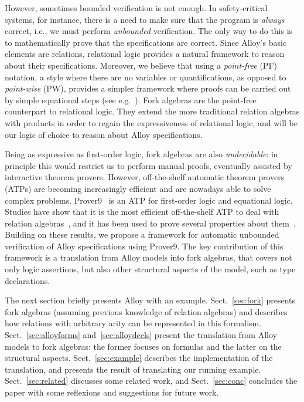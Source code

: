 \documentclass{llncs}
\begin{document}
However, sometimes bounded verification is not enough. In
safety-critical systems, for instance, there is a need to make sure
that the program is \emph{always} correct, i.e., we must perform
\emph{unbounded} verification. The only way to do this is to
mathematically prove that the specifications are correct. Since
Alloy's basic elements are relations, relational logic provides a
natural framework to reason about their specifications. Moreover, we
believe that using a \emph{point-free} (PF) notation, a style where
there are no variables or quantifications, as opposed to
\emph{point-wise} (PW), provides a simpler framework where proofs can
be carried out by simple equational steps (see
e.g.~\cite{escpf}). Fork algebras are the point-free counterpart to
relational logic. They extend the more traditional relation algebras
with products in order to regain the expressiveness of relational
logic, and will be our logic of choice to reason about Alloy
specifications.

Being as expressive as first-order logic, fork algebras are also
\emph{undecidable}: in principle this would restrict us to perform
manual proofs, eventually assisted by interactive theorem
provers. However, off-the-shelf automatic theorem provers (ATPs) are
becoming increasingly efficient and are nowadays able to solve complex
problems. Prover9~\cite{prover9} is an ATP for first-order logic and
equational logic. Studies have show that it is the most efficient
off-the-shelf ATP to deal with relation algebras~\cite{atmcomp}, and
it has been used to prove several properties about them~\cite{crp9}.
Building on these results, we propose a framework for automatic
unbounded verification of Alloy specifications using Prover9. The key
contribution of this framework is a translation from Alloy models into
fork algebras, that covers not only logic assertions, but also other
structural aspects of the model, such as type declarations.

The next section briefly presents Alloy with an
example. Sect.~\ref{sec:fork} presents fork algebras (assuming
previous knowledge of relation algebras) and describes how relations
with arbitrary arity can be represented in this
formalism. Sect.~\ref{sec:alloyforms} and~\ref{sec:alloydecls}
present the translation from Alloy models to fork algebras: the former
focuses on formulas and the latter on the structural
aspects. Sect.~\ref{sec:example} describes the implementation of the
translation, and presents the result of translating our
running example. Sect.~\ref{sec:related} discusses some related
work, and Sect.~\ref{sec:conc} concludes the paper with some
reflexions and suggestions for future work.
\end{document}
